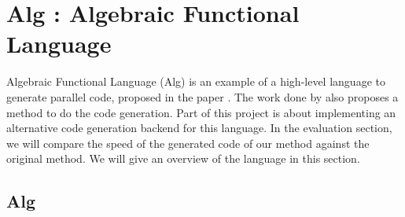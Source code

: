 \chapter{Alg : Algebraic Functional Language} \label{chap:alg}
Algebraic Functional Language (Alg) is an example of a high-level language to generate parallel code, proposed in the paper \cite{AlgebraicMultipartyProtocol}. The work done by \cite{AlgebraicMultipartyProtocol} also proposes a method to do the code generation. Part of this project is about implementing an alternative code generation backend for this language. In the evaluation section, we will compare the speed of the generated code of our method against the original method. We will give an overview of the language in this section.  
\section{Alg}
